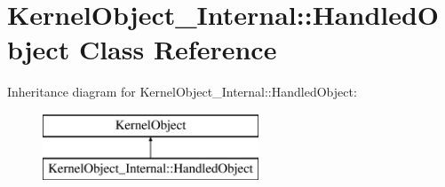 \hypertarget{class_kernel_object___internal_1_1_handled_object}{}\section{Kernel\+Object\+\_\+\+Internal\+:\+:Handled\+Object Class Reference}
\label{class_kernel_object___internal_1_1_handled_object}
Inheritance diagram for Kernel\+Object\+\_\+\+Internal\+:\+:Handled\+Object\+:\begin{figure}[H]
\begin{center}
\leavevmode
\includegraphics[height=2.000000cm]{class_kernel_object___internal_1_1_handled_object}
\end{center}
\end{figure}
